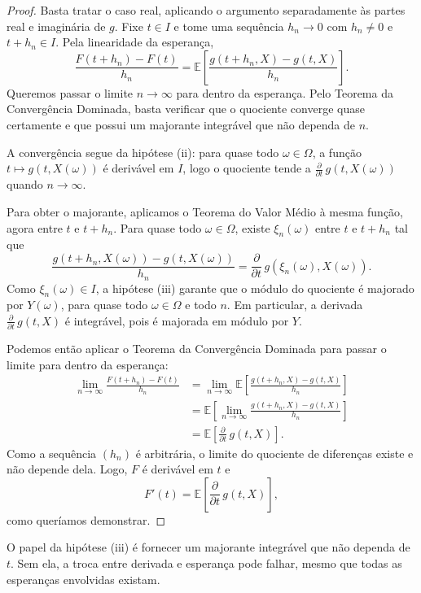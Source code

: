 \documentclass[12pt,portuguese]{article}
\theoremstyle{definition}
\theoremstyle{plainexercise}
\theoremstyle{starredexercise}
\theoremstyle{definition}
\begin{document}
\begin{proof}
Basta tratar o caso real, aplicando o argumento separadamente às partes real e
imaginária de $g$. Fixe $t\in I$ e tome uma sequência $h_n\to0$ com $h_n\neq0$
e $t+h_n\in I$. Pela linearidade da esperança,
\[
\frac{F(t+h_n)-F(t)}{h_n}
=
\mathbb{E}\left[
\frac{g(t+h_n,X)-g(t,X)}{h_n}
\right].
\]
Queremos passar o limite $n\to\infty$ para dentro da esperança. Pelo Teorema
da Convergência Dominada, basta verificar que o quociente converge quase
certamente e que possui um majorante integrável que não dependa de $n$.

A convergência segue da hipótese (ii): para quase todo $\omega\in\Omega$, a
função $t\mapsto g(t,X(\omega))$ é derivável em $I$, logo o quociente tende a
$\frac{\partial}{\partial t}\,g(t,X(\omega))$ quando $n\to\infty$.

Para obter o majorante, aplicamos o Teorema do Valor Médio à mesma função,
agora entre $t$ e $t+h_n$. Para quase todo $\omega\in\Omega$, existe
$\xi_n(\omega)$ entre $t$ e $t+h_n$ tal que
\[
\frac{g(t+h_n,X(\omega))-g(t,X(\omega))}{h_n}
=
\frac{\partial}{\partial t}\,g(\xi_n(\omega),X(\omega)).
\]
Como $\xi_n(\omega)\in I$, a hipótese (iii) garante que o módulo do quociente
é majorado por $Y(\omega)$, para quase todo $\omega\in\Omega$ e todo $n$. Em
particular, a derivada $\frac{\partial}{\partial t}\,g(t,X)$ é integrável, pois
é majorada em módulo por $Y$.

Podemos então aplicar o Teorema da Convergência Dominada para passar o limite
para dentro da esperança:
\begin{align*}
\lim_{n\to\infty}\frac{F(t+h_n)-F(t)}{h_n}
&=
\lim_{n\to\infty}\mathbb{E}\left[
\frac{g(t+h_n,X)-g(t,X)}{h_n}
\right]
\\[0.25cm]
&=
\mathbb{E}\left[
\lim_{n\to\infty}\frac{g(t+h_n,X)-g(t,X)}{h_n}
\right]
\\[0.25cm]
&=
\mathbb{E}\left[
\frac{\partial}{\partial t}\,g(t,X)
\right].
\end{align*}
Como a sequência $(h_n)$ é arbitrária, o limite do quociente de diferenças
existe e não depende dela. Logo, $F$ é derivável em $t$ e
\[
F'(t)
=
\mathbb{E}\left[
\frac{\partial}{\partial t}\,g(t,X)
\right],
\]
como queríamos demonstrar.
\end{proof}

O papel da hipótese (iii) é fornecer um majorante integrável que não dependa de
$t$. Sem ela, a troca entre derivada e esperança pode falhar, mesmo que todas as
esperanças envolvidas existam.
\end{document}
